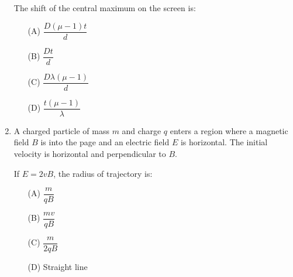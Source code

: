 \documentclass[12pt]{article}
\begin{document}
\begin{enumerate}[leftmargin=0pt,itemindent=0pt]
The shift of the central maximum on the screen is: 

\begin{center}
\end{center}


\begin{enumerate}
\item[(A)] $\dfrac{D(\mu-1)t}{d}$
\item[(B)] $\dfrac{Dt}{d}$
\item[(C)] $\dfrac{D\lambda(\mu-1)}{d}$
\item[(D)] $\dfrac{t(\mu-1)}{\lambda}$
\end{enumerate}


\item A charged particle of mass $m$ and charge $q$ enters a region where a magnetic field $B$ is into the page and an electric field $E$ is horizontal. The initial velocity is horizontal and perpendicular to $B$.

If $E = 2vB$, the radius of trajectory is:

\begin{center}
\end{center}

\begin{enumerate}
\item[(A)] $\dfrac{m}{qB}$
\item[(B)] $\dfrac{mv}{qB}$
\item[(C)] $\dfrac{m}{2qB}$
\item[(D)] Straight line
\end{enumerate}


\end{enumerate}
\end{document}
